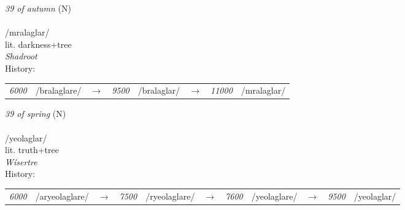 \vspace{15pt}
\begin{nopagebreak}
 \textit{39 of autumn} (N)\\
\\
\noindent /mral{\textprimstress}aglar/\\
\noindent lit. darkness+tree\\
\noindent \textit{Shadroot}\\


\noindent History:

\vspace{-0pt}
\hspace{40pt}
\begin{tabular}{ccc}
\textit{6000} & /bralaglare/&$\rightarrow$ & \textit{9500} & /bralaglar/&$\rightarrow$ & \textit{11000} & /mralaglar/& \\
\end{tabular}

\vspace{20pt}\hline

\end{nopagebreak}
\filbreak



\vspace{15pt}
\begin{nopagebreak}
 \textit{39 of spring} (N)\\
\\
\noindent /yeol{\textprimstress}aglar/\\
\noindent lit. truth+tree\\
\noindent \textit{Wísertre}\\


\noindent History:

\vspace{-0pt}
\hspace{40pt}
\begin{tabular}{ccc}
\textit{6000} & /aryeolaglare/&$\rightarrow$ & \textit{7500} & /ryeolaglare/&$\rightarrow$ & \textit{7600} & /yeolaglare/&$\rightarrow$ & \textit{9500} & /yeolaglar/& \\
\end{tabular}

\vspace{20pt}\hline

\end{nopagebreak}
\filbreak



